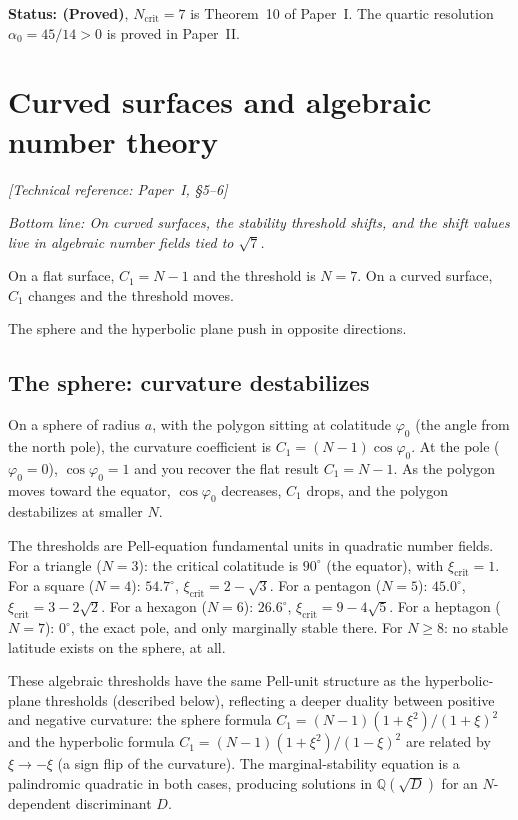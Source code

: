 \textbf{Status: (Proved)}, $N_{\mathrm{crit}} = 7$ is Theorem~10 of
Paper~I. The quartic resolution $\alpha_0 = 45/14 > 0$ is proved in
Paper~II.


\section{Curved surfaces and algebraic number theory}
\noindent\textit{[Technical reference: Paper~I, \S5--6]}

\medskip

\noindent\textit{Bottom line: On curved surfaces, the stability
threshold shifts, and the shift values live in algebraic number
fields tied to $\sqrt{7}$.}

\medskip

On a flat surface, $C_1 = N - 1$ and the threshold is $N = 7$. On a
curved surface, $C_1$ changes and the threshold moves.

The sphere and the hyperbolic plane push in opposite directions.

\subsection*{The sphere: curvature destabilizes}

On a sphere of radius $a$, with the polygon sitting at colatitude
$\varphi_0$ (the angle from the north pole), the curvature coefficient
is $C_1 = (N-1)\cos\varphi_0$. At the pole ($\varphi_0 = 0$),
$\cos\varphi_0 = 1$ and you recover the flat result $C_1 = N - 1$.
As the polygon moves toward the equator, $\cos\varphi_0$ decreases,
$C_1$ drops, and the polygon destabilizes at smaller $N$.

The thresholds are Pell-equation fundamental units in quadratic
number fields.  For a triangle ($N = 3$): the critical colatitude is
$90^\circ$ (the equator), with $\xi_{\mathrm{crit}} = 1$. For a
square ($N = 4$): $54.7^\circ$, $\xi_{\mathrm{crit}} = 2 - \sqrt{3}$.
For a pentagon ($N = 5$): $45.0^\circ$,
$\xi_{\mathrm{crit}} = 3 - 2\sqrt{2}$. For a hexagon ($N = 6$):
$26.6^\circ$, $\xi_{\mathrm{crit}} = 9 - 4\sqrt{5}$. For a heptagon
($N = 7$): $0^\circ$, the exact pole, and only marginally stable
there. For $N \ge 8$: no stable latitude exists on the sphere, at all.

These algebraic thresholds have the same Pell-unit structure as the
hyperbolic-plane thresholds (described below), reflecting a deeper
duality between positive and negative curvature: the sphere formula
$C_1 = (N{-}1)(1+\xi^2)/(1+\xi)^2$ and the hyperbolic formula
$C_1 = (N{-}1)(1+\xi^2)/(1-\xi)^2$ are related by $\xi \to -\xi$
(a sign flip of the curvature).  The marginal-stability equation is
a palindromic quadratic in both cases, producing solutions in
$\mathbb{Q}(\sqrt{D})$ for an $N$-dependent discriminant $D$.

